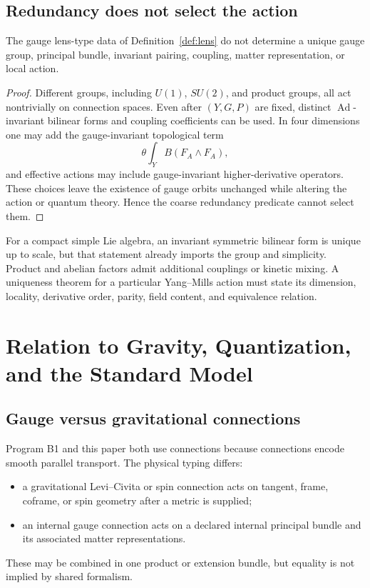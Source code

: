 \documentclass[11pt]{article}
\newcommand{\Ad}{\operatorname{Ad}}
\begin{document}
\subsection{Redundancy does not select the action}

\begin{theorem}
\label{thm:no-unique-ym}
The gauge lens-type data of Definition~\ref{def:lens} do not determine a unique
gauge group, principal bundle, invariant pairing, coupling, matter
representation, or local action.
\end{theorem}

\begin{proof}
Different groups, including $U(1)$, $SU(2)$, and product groups, all act
nontrivially on connection spaces.  Even after $(Y,G,P)$ are fixed, distinct
$\Ad$-invariant bilinear forms and coupling coefficients can be used.  In four
dimensions one may add the gauge-invariant topological term
\[
 \theta\int_Y B(F_A\wedge F_A),
\]
and effective actions may include gauge-invariant higher-derivative operators.
These choices leave the existence of gauge orbits unchanged while altering
the action or quantum theory.  Hence the coarse redundancy predicate cannot
select them.
\end{proof}

For a compact simple Lie algebra, an invariant symmetric bilinear form is
unique up to scale, but that statement already imports the group and
simplicity.  Product and abelian factors admit additional couplings or kinetic
mixing.  A uniqueness theorem for a particular Yang--Mills action must state
its dimension, locality, derivative order, parity, field content, and
equivalence relation.

\section{Relation to Gravity, Quantization, and the Standard Model}

\subsection{Gauge versus gravitational connections}

Program B1 and this paper both use connections because connections encode
smooth parallel transport.  The physical typing differs:
\begin{itemize}
\item a gravitational Levi--Civita or spin connection acts on tangent, frame,
coframe, or spin geometry after a metric is supplied;
\item an internal gauge connection acts on a declared internal principal
bundle and its associated matter representations.
\end{itemize}
These may be combined in one product or extension bundle, but equality is not
implied by shared formalism.
\end{document}
